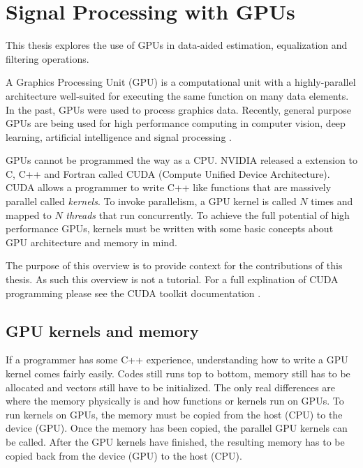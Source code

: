 

\chapter{Signal Processing with GPUs}
\label{sec:gpu}

This thesis explores the use of GPUs in data-aided estimation, equalization and filtering operations.

A Graphics Processing Unit (GPU) is a computational unit with a highly-parallel architecture well-suited for executing the same function on many data elements.
In the past, GPUs were used to process graphics data.
Recently, general purpose GPUs are being used for high performance computing in computer vision, deep learning, artificial intelligence and signal processing \cite{wikipedia-gpu:2015}.

GPUs cannot be programmed the way as a CPU. 
NVIDIA released a extension to C, C++ and Fortran called CUDA (Compute Unified Device Architecture).
CUDA allows a programmer to write C++ like functions that are massively parallel called \textit{kernels}.
To invoke parallelism, a GPU kernel is called $N$ times and mapped to $N$ \textit{threads} that run concurrently.
To achieve the full potential of high performance GPUs, kernels must be written with some basic concepts about GPU architecture and memory in mind.

The purpose of this overview is to provide context for the contributions of this thesis.
As such this overview is not a tutorial.
For a full explination of CUDA programming please see the CUDA toolkit documentation \cite{CUDA_toolkit_doc}.

\section{GPU kernels and memory}
If a programmer has some C++ experience, understanding how to write a GPU kernel comes fairly easily.
Codes still runs top to bottom, memory still has to be allocated and vectors still have to be initialized.
The only real differences are where the memory physically is and how functions or kernels run on GPUs.
To run kernels on GPUs, the memory must be copied from the host (CPU) to the device (GPU).
Once the memory has been copied, the parallel GPU kernels can be called.
After the GPU kernels have finished, the resulting memory has to be copied back from the device (GPU) to the host (CPU).

